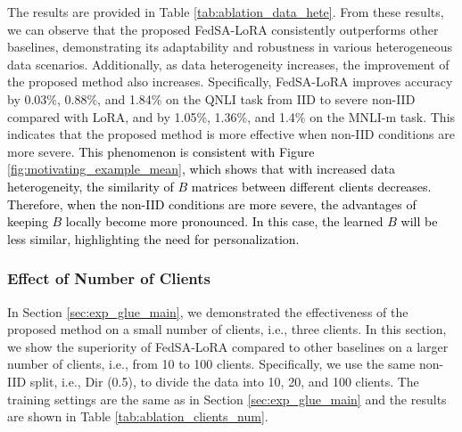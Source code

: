 \documentclass{article} %
\newcommand{\pengxin}[1]{\textcolor{black}{#1}}
\begin{document}
\begin{table}[h]
\caption{Performance comparison on the QNLI, SST2, and MNLI-m tasks with various degrees of data heterogeneity.}
\label{tab:ablation_data_hete}
\vspace{-0.3cm}
\begin{center}
\end{center}
\end{table}

The results are provided in Table \ref{tab:ablation_data_hete}. From these results, we can observe that the proposed FedSA-LoRA consistently outperforms other baselines, demonstrating its adaptability and robustness in various heterogeneous data scenarios. Additionally, as data heterogeneity increases, the improvement of the proposed method also increases. Specifically, FedSA-LoRA improves accuracy by 0.03\%, 0.88\%, and 1.84\% on the QNLI task from IID to severe non-IID compared with LoRA, and by 1.05\%, 1.36\%, and 1.4\% on the MNLI-m task. This indicates that the proposed method is more effective when non-IID conditions are more severe.
\pengxin{This phenomenon is consistent with Figure \ref{fig:motivating_example_mean}, which shows that with increased data heterogeneity, the similarity of $B$ matrices between different clients decreases. Therefore, when the non-IID conditions are more severe, the advantages of keeping $B$ locally become more pronounced. In this case, the learned $B$ will be less similar, highlighting the need for personalization.}


\subsubsection{Effect of Number of Clients}
In Section \ref{sec:exp_glue_main}, we demonstrated the effectiveness of the proposed method on a small number of clients, i.e., three clients. In this section, we show the superiority of FedSA-LoRA compared to other baselines on a larger number of clients, i.e., from 10 to 100 clients. Specifically, we use the same non-IID split, i.e., Dir (0.5), to divide the data into 10, 20, and 100 clients. The training settings are the same as in Section \ref{sec:exp_glue_main} and the results are shown in Table \ref{tab:ablation_clients_num}.
\end{document}
